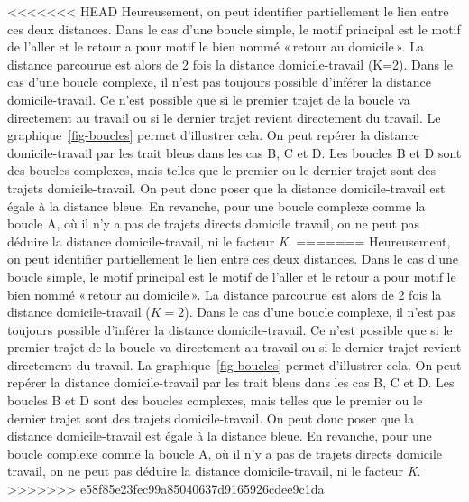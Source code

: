 \documentclass[
  9pt,
  a4paper,
  DIV=11]{scrreprt}
\begin{document}
\textless\textless\textless\textless\textless\textless\textless{} HEAD
Heureusement, on peut identifier partiellement le lien entre ces deux
distances. Dans le cas d'une boucle simple, le motif principal est le
motif de l'aller et le retour a pour motif le bien nommé «\,retour au
domicile\,». La distance parcourue est alors de 2 fois la distance
domicile-travail (K=2). Dans le cas d'une boucle complexe, il n'est pas
toujours possible d'inférer la distance domicile-travail. Ce n'est
possible que si le premier trajet de la boucle va directement au travail
ou si le dernier trajet revient directement du travail. Le
graphique~\ref{fig-boucles} permet d'illustrer cela. On peut repérer la
distance domicile-travail par les trait bleus dans les cas B, C et D.
Les boucles B et D sont des boucles complexes, mais telles que le
premier ou le dernier trajet sont des trajets domicile-travail. On peut
donc poser que la distance domicile-travail est égale à la distance
bleue. En revanche, pour une boucle complexe comme la boucle A, où il
n'y a pas de trajets directs domicile travail, on ne peut pas déduire la
distance domicile-travail, ni le facteur \emph{K}. ======= Heureusement,
on peut identifier partiellement le lien entre ces deux distances. Dans
le cas d'une boucle simple, le motif principal est le motif de l'aller
et le retour a pour motif le bien nommé «\,retour au domicile\,». La
distance parcourue est alors de 2 fois la distance domicile-travail
(\(K=2\)). Dans le cas d'une boucle complexe, il n'est pas toujours
possible d'inférer la distance domicile-travail. Ce n'est possible que
si le premier trajet de la boucle va directement au travail ou si le
dernier trajet revient directement du travail. La
graphique~\ref{fig-boucles} permet d'illustrer cela. On peut repérer la
distance domicile-travail par les trait bleus dans les cas B, C et D.
Les boucles B et D sont des boucles complexes, mais telles que le
premier ou le dernier trajet sont des trajets domicile-travail. On peut
donc poser que la distance domicile-travail est égale à la distance
bleue. En revanche, pour une boucle complexe comme la boucle A, où il
n'y a pas de trajets directs domicile travail, on ne peut pas déduire la
distance domicile-travail, ni le facteur \emph{K}.
\textgreater\textgreater\textgreater\textgreater\textgreater\textgreater\textgreater{}
e58f85e23fec99a85040637d9165926cdee9c1da
\end{document}
